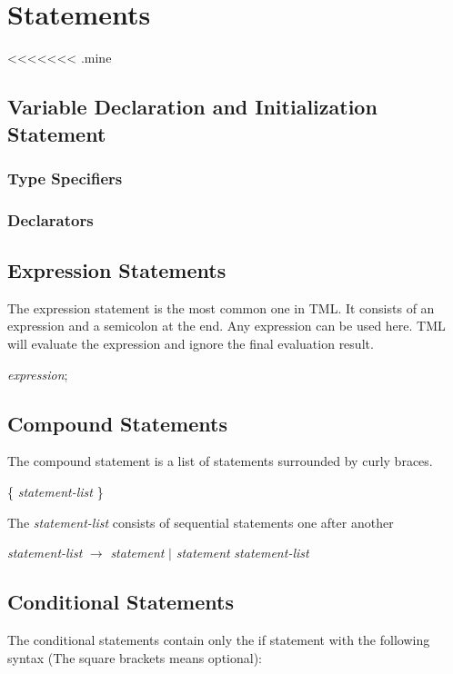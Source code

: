 \documentclass[12pt,psfig,a4]{article}
\begin{document}
\section{Statements}

<<<<<<< .mine
\subsection{Variable Declaration and Initialization Statement}

\subsubsection{Type Specifiers}

\subsubsection{Declarators}

\subsection{Expression Statements}
The expression statement is the most common one in TML. It consists of an expression and a semicolon at the end. Any expression can be used here. TML will evaluate the expression and ignore the final evaluation result.

\begin{code}
	\textit{expression};
\end{code}

\subsection{Compound Statements}
The compound statement is a list of statements surrounded by curly braces.

\begin{code}
\{ \textit{statement-list}
\}
\end{code}

\noindent
The \textit{statement-list} consists of sequential statements one after another

\begin{code}
\textit{statement-list}  $\rightarrow$ \textit{statement} $\mid$ \textit{statement} \textit{statement-list}
\end{code}

\subsection{Conditional Statements}
The conditional statements contain only the if statement with the following syntax (The square brackets means optional):
\end{document}
